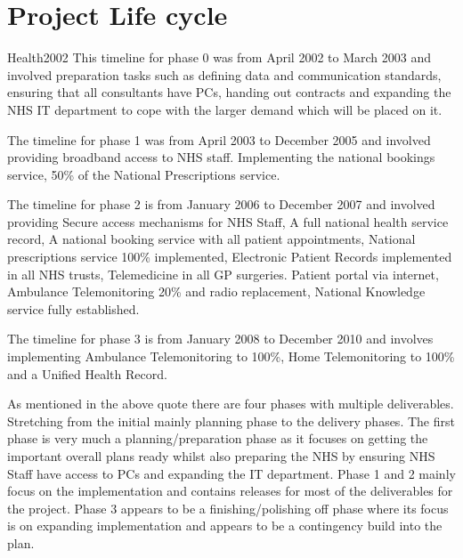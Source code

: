 \documentclass[a4paper,12pt]{scrartcl}
\begin{document}
	\section{Project Life cycle}
	{
		\begin{displaycquote}{Health2002}
			This timeline for phase 0 was from April 2002 to March 2003 and involved preparation tasks such as defining data and communication standards, ensuring that all consultants have PCs, handing out contracts and expanding the NHS IT department to cope with the larger demand which will be placed on it.

			The timeline for phase 1 was from April 2003 to December 2005 and involved providing broadband access to NHS staff. Implementing the national bookings service, 50\% of the National Prescriptions service.

			The timeline for phase 2 is from January 2006 to December 2007 and involved providing Secure access mechanisms for NHS Staff, A full national health service record, A national booking service with all patient appointments, National prescriptions service 100\% implemented, Electronic Patient Records implemented in all NHS trusts, Telemedicine in all GP surgeries. Patient portal via internet, Ambulance Telemonitoring 20\% and radio replacement, National Knowledge service fully established.

			The timeline for phase 3 is from January 2008 to December 2010 and involves implementing Ambulance Telemonitoring to 100\%, Home Telemonitoring to 100\% and a Unified Health Record.
		\end{displaycquote}
		As mentioned in the above quote there are four phases with multiple deliverables. Stretching from the initial mainly planning phase to the delivery phases. The first phase is very much a planning/preparation phase as it focuses on getting the important overall plans ready whilst also preparing the NHS by ensuring NHS Staff have access to PCs and expanding the IT department. Phase 1 and 2 mainly focus on the implementation and contains releases for most of the deliverables for the project. Phase 3 appears to be a finishing/polishing off phase where its focus is on expanding implementation and appears to be a contingency build into the plan.
	}
\end{document}
